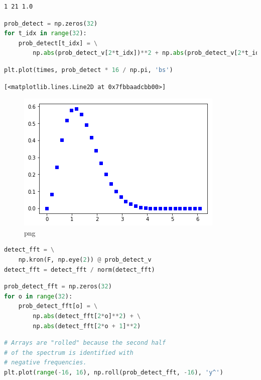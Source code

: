 \begin{lstlisting}
1 21 1.0
\end{lstlisting}

\begin{lstlisting}[language=Python]
prob_detect = np.zeros(32)
for t_idx in range(32):
    prob_detect[t_idx] = \
        np.abs(prob_detect_v[2*t_idx])**2 + np.abs(prob_detect_v[2*t_idx+1])**2
\end{lstlisting}

\begin{lstlisting}[language=Python]
plt.plot(times, prob_detect * 16 / np.pi, 'bs')
\end{lstlisting}

\begin{lstlisting}
[<matplotlib.lines.Line2D at 0x7fbbaadcbb00>]
\end{lstlisting}

\begin{figure}
\centering
\includegraphics[width=0.66\linewidth]{output_92_1.png}
\caption[]{png}
\end{figure}

\begin{lstlisting}[language=Python]
detect_fft = \
    np.kron(F, np.eye(2)) @ prob_detect_v
detect_fft = detect_fft / norm(detect_fft)
\end{lstlisting}

\begin{lstlisting}[language=Python]
prob_detect_fft = np.zeros(32)
for o in range(32):
    prob_detect_fft[o] = \
        np.abs(detect_fft[2*o]**2) + \
        np.abs(detect_fft[2*o + 1]**2) 
\end{lstlisting}

\begin{lstlisting}[language=Python]
# Arrays are "rolled" because the second half 
# of the spectrum is identified with
# negative frequencies.
plt.plot(range(-16, 16), np.roll(prob_detect_fft, -16), 'y^')
\end{lstlisting}

